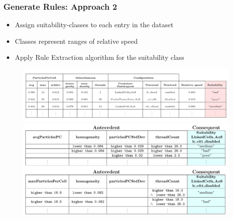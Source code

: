 \documentclass[
	10pt,
	t		%
]{beamer}
\begin{document}
\begin{frame}
	\frametitle{Generate Rules: Approach 2}

	\begin{itemize}
		\item Assign suitability-classes to each entry in the dataset
		\item Classes represent ranges of relative speed
		\item Apply Rule Extraction algorithm for the suitability class
	\end{itemize}

	\begin{figure}
		\centering
		\includegraphics[width=1\textwidth, trim={0 2.25cm 0 0},clip]{figures/aggregated-data-suitability.png}
		\vspace{1.5cm}
		\includegraphics[width=1\textwidth, trim={0 9cm 0 0.1cm},clip]{figures/final-rules-suitability.png}
	\end{figure}
\end{frame}
\end{document}
